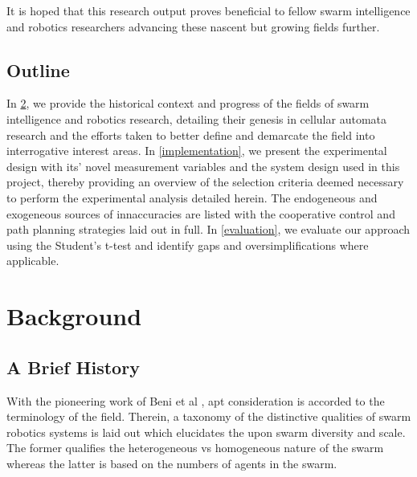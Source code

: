 \documentclass{report}
\begin{document}
It is hoped that this research output proves beneficial to fellow swarm intelligence and robotics researchers advancing these nascent but growing fields further.

\section{Outline}

In \ref{background}, we provide the historical context and progress of the fields of swarm intelligence and robotics research, detailing their genesis in cellular automata research and the efforts taken to better define and demarcate the field into interrogative interest areas. In \ref{implementation}, we present the experimental design with its' novel measurement variables and the system design used in this project, thereby providing an overview of the selection criteria deemed necessary to perform the experimental analysis detailed herein. The endogeneous and exogeneous sources of innaccuracies are listed with the cooperative control and path planning strategies laid out in full. In \ref{evaluation}, we evaluate our approach using the Student's t-test \cite{Kennedy1995} and identify gaps and oversimplifications where applicable.

\chapter{Background} \label{background}

\section{A Brief History}
With the pioneering work of Beni et al \cite{Beni2005a}, apt consideration is accorded to the terminology of the field. Therein, a taxonomy of the distinctive qualities of swarm robotics systems is laid out which elucidates the upon swarm diversity and scale. The former qualifies the heterogeneous vs homogeneous nature of the swarm whereas the latter is based on the numbers of agents in the swarm.
\end{document}
